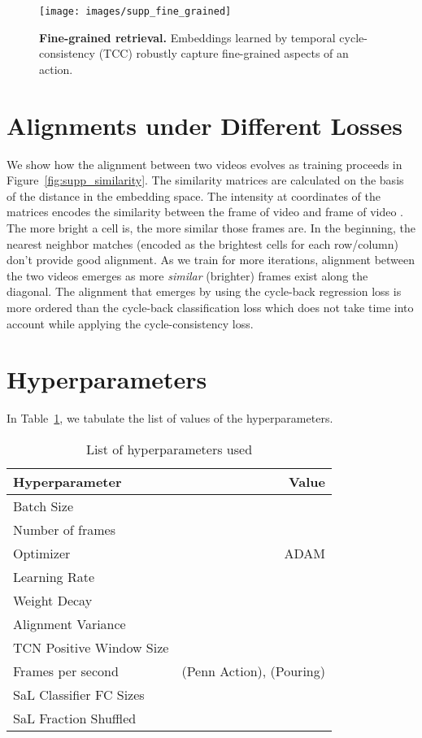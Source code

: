\documentclass[10pt,twocolumn,letterpaper]{article}
\begin{document}
\begin{figure*}
    \centering
    \texttt{[image: images/supp\_fine\_grained]}
    \caption{\textbf{Fine-grained retrieval.} Embeddings learned by temporal cycle-consistency (TCC) robustly capture fine-grained aspects of an action.}
    \label{fig:supp_finegrained}
\end{figure*}

\section{Alignments under Different Losses}
\label{sec:similarity_matrix}
We show how the alignment between two videos evolves as training proceeds in Figure~\ref{fig:supp_similarity}. The similarity matrices are calculated on the basis of the distance in the embedding space. The intensity at  coordinates of the matrices encodes the similarity between the  frame of video  and  frame of video . The more bright a cell is, the more similar those frames are. In the beginning, the nearest neighbor matches (encoded as the brightest cells for each row/column) don't provide good alignment. As we train for more iterations, alignment between the two videos emerges as more \textit{similar} (brighter) frames exist along the diagonal. The alignment that emerges by using the cycle-back regression loss is more ordered than the cycle-back classification loss which does not take time into account while applying the cycle-consistency loss.


\section{Hyperparameters}
In Table~\ref{tab:hyperparams}, we tabulate the list of values of the hyperparameters.


\begin{table}[!h]
\setlength{\tabcolsep}{0.5em}
\renewcommand{\arraystretch}{1.15}
\centering

    \begin{tabular}{l|r}
        \toprule
        \textbf{Hyperparameter} & \textbf{Value} \\
        \midrule
        \midrule
        Batch Size &  \\
        Number of frames &  \\
        Optimizer & ADAM \\
        Learning Rate & \\
        Weight Decay & \\
        Alignment Variance  &  \\
        TCN Positive Window Size & \\
        Frames per second &  (Penn Action),  (Pouring) \\
        SaL Classifier FC Sizes & \\
        SaL Fraction Shuffled & \\
        \bottomrule
    \end{tabular}
    \caption{List of hyperparameters used}
\label{tab:hyperparams}
\end{table}
\end{document}
